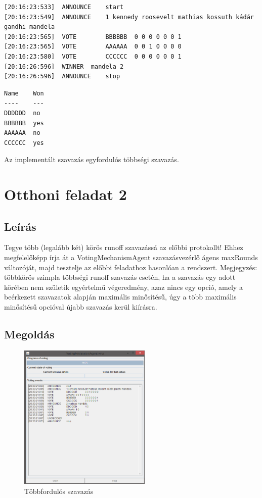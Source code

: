 \begin{lstlisting}[caption=A log.txt tartalma, frame=single,float=!ht]
[20:16:23:533]	ANNOUNCE	start
[20:16:23:549]	ANNOUNCE	1 kennedy roosevelt mathias kossuth kádár gandhi mandela
[20:16:23:565]	VOTE		BBBBBB	0 0 0 0 0 0 1
[20:16:23:565]	VOTE		AAAAAA	0 0 1 0 0 0 0
[20:16:23:580]	VOTE		CCCCCC	0 0 0 0 0 0 1
[20:16:26:596]	WINNER	mandela 2
[20:16:26:596]	ANNOUNCE	stop
\end{lstlisting}
\begin{lstlisting}[caption=A rest.txt tartalma, frame=single,float=!ht]
Name	Won
----	---
DDDDDD	no
BBBBBB	yes
AAAAAA	no
CCCCCC	yes
\end{lstlisting}

Az implementált szavazás egyfordulós többségi szavazás.

\section{Otthoni feladat 2}
\subsection{Leírás}
Tegye több (legalább két) körös runoff szavazássá az előbbi protokollt! Ehhez
megfelelőképp írja át a  VotingMechanismAgent szavazásvezérlő ágens  maxRounds
változóját, majd tesztelje az előbbi feladathoz hasonlóan a rendszert.  Megjegyzés:
többkörös szimpla többségi runoff szavazás esetén, ha a szavazás egy adott körében nem születik
egyértelmű végeredmény, azaz nincs egy opció, amely a beérkezett szavazatok alapján maximális
minősítésű, úgy a több maximális minősítésű opcióval újabb szavazás kerül kiírásra.
\subsection{Megoldás}
\begin{figure}[!h]
\begin{center}
\includegraphics[height=7cm]{figures/ofel2.png}
\caption{Többfordulós szavazás}
\end{center}
\end{figure}

